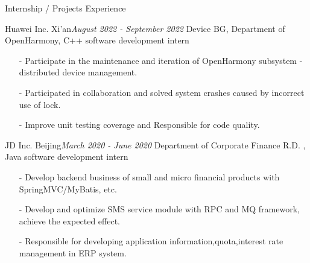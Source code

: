 \documentclass{resume} %
\begin{document}

\begin{rSection}{Internship / Projects Experience}

\begin{rSubsection}{Huawei Inc. Xi'an}{\em August 2022 - September 2022}
{Device BG, Department of OpenHarmony, C++ software development intern}
{}
    \item[]
    \begin{itemize}
    \setlength\itemsep{-0.5em}
        \item[-] Participate in the maintenance and iteration of OpenHarmony subsystem - distributed device management.
        \item[-] Participated in collaboration and solved system crashes caused by incorrect use of lock.
        \item[-] Improve unit testing coverage and Responsible for code quality.
    \end{itemize}
\end{rSubsection}


\begin{rSubsection}{JD Inc. Beijing}{\em March 2020 - June 2020}
{Department of Corporate Finance R.D. , Java software development intern}
{}
    \item[]
    \begin{itemize}
    \setlength\itemsep{-0.5em}
        \item[-] Develop backend business of small and micro financial products with SpringMVC/MyBatis, etc.
        \item[-] Develop and optimize SMS service module with RPC and MQ framework, achieve the expected effect.
        \item[-] Responsible for developing application information,quota,interest rate management in ERP system.
    \end{itemize}
\end{rSubsection}



\end{rSection}
\end{document}
